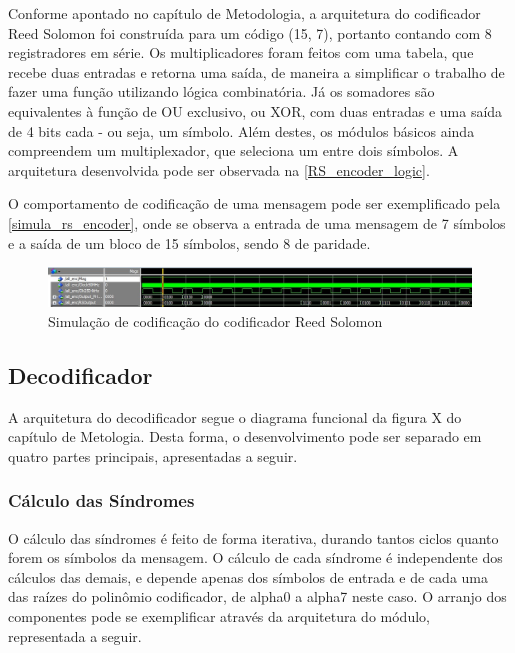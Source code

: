 	Conforme apontado no capítulo de Metodologia, a arquitetura do codificador Reed Solomon foi construída para um código (15, 7), portanto contando com 8 registradores em série. Os multiplicadores foram feitos com uma tabela,  que recebe duas entradas e retorna uma saída, de maneira a simplificar o trabalho de fazer uma função utilizando lógica combinatória. Já os somadores são equivalentes à função de OU exclusivo, ou XOR, com duas entradas e uma saída de 4 bits cada - ou seja, um símbolo. Além destes, os módulos básicos ainda compreendem um multiplexador, que seleciona um entre dois símbolos. A arquitetura desenvolvida pode ser observada na \autoref{RS_encoder_logic}.
	
	O comportamento de codificação de uma mensagem pode ser exemplificado pela \autoref{simula_rs_encoder}, onde se observa a entrada de uma mensagem de 7 símbolos e a saída de um bloco de 15 símbolos, sendo 8 de paridade.
	
	\begin{figure}[htb]
		\caption{\label{simula_rs_encoder} Simulação de codificação do codificador Reed Solomon}
		\centering
		\includegraphics[width=1\textwidth]{RS/Sim_encoder}
	\end{figure}
	
	\subsection{Decodificador}
	
	A arquitetura do decodificador segue o diagrama funcional da figura X do capítulo de Metologia. Desta forma, o desenvolvimento pode ser separado em quatro partes principais, apresentadas a seguir.
	
	\subsubsection{Cálculo das Síndromes}
	
	O cálculo das síndromes é feito de forma iterativa, durando tantos ciclos quanto forem os símbolos da mensagem. O cálculo de cada síndrome é independente dos cálculos das demais, e depende apenas dos símbolos de entrada e de cada uma das raízes do polinômio codificador, de alpha0 a alpha7 neste caso. O arranjo dos componentes pode se exemplificar através da arquitetura do módulo, representada a seguir.
	
